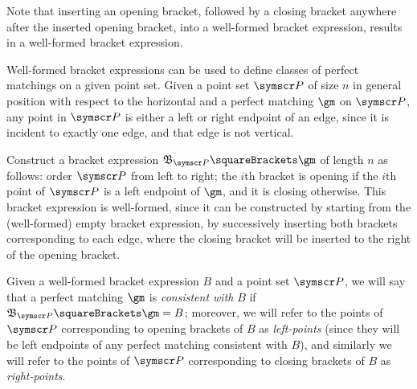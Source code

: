\documentclass[10pt, a4paper, twoside]{basestyle}
\newcommand{\pointset}{\symscr}
\begin{document}
Note that inserting an opening bracket, followed by a closing bracket anywhere after the
inserted opening bracket, into a well-formed bracket expression, results in a well-formed bracket
expression.

Well-formed bracket expressions can be used to define classes of perfect matchings on a given point set.
Given a point set $\pointset P$  of size $n$ in general position with respect to the horizontal and a perfect
matching $\gm$ on $\pointset P$, any point in $\pointset P$ is either a left or right endpoint of an edge, since it
is incident to exactly one edge, and that edge is not vertical.

Construct a bracket expression ${\mathfrak B}_{\pointset P}\of\gm$ of length $n$ as follows: order $\pointset P$ from left
to right;
the $i$th bracket is opening if the $i$th point of $\pointset P$ is a left endpoint of $\gm$, and it is
closing otherwise.
This bracket expression is well-formed, since it can be constructed by starting from the
(well-formed) empty bracket expression, by successively inserting both brackets corresponding to
each edge, where the closing bracket will be inserted to the right of the opening bracket.

Given a well-formed bracket expression $B$ and a point set $\pointset P$, we will say that a perfect matching
$\gm$ is \emph{consistent with} $B$ if ${\mathfrak B}_{\pointset P}\of\gm = B$; moreover, we will refer to the points of
$\pointset P$ corresponding to opening brackets of $B$ as \emph{left-points} (since they will be left endpoints
of any perfect matching consistent with $B$), and similarly we will refer to the points of $\pointset P$
corresponding to closing brackets of $B$ as \emph{right-points}.
\end{document}
